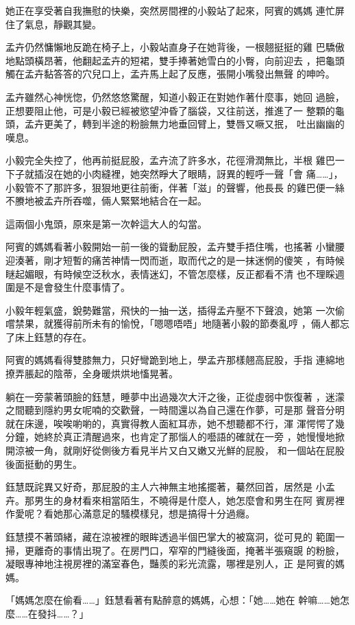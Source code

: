她正在享受著自我撫慰的快樂，突然房間裡的小毅站了起來，阿賓的媽媽
連忙屏住了氣息，靜觀其變。

孟卉仍然慵懶地反跪在椅子上，小毅站直身子在她背後，一根翹挺挺的雞
巴驕傲地點頭橫昂著，他翻起孟卉的短裙，雙手捧著她雪白的小臀，向前迎去
，把龜頭觸在孟卉黏答答的穴兒口上，孟卉馬上起了反應，張開小嘴發出無聲
的呻吟。

孟卉雖然心神恍惚，仍然悠悠驚醒，知道小毅正在對她作著什麼事，她回
過臉，正想要阻止他，可是小毅已經被慾望沖昏了腦袋，又往前送，推進了一
整顆的龜頭，孟卉更美了，轉到半途的粉臉無力地垂回臂上，雙唇又噘又抿，
吐出幽幽的嘆息。

小毅完全失控了，他再前挺屁股，孟卉流了許多水，花徑滑潤無比，半根
雞巴一下子就插沒在她的小肉縫裡，她突然睜大了眼睛，訝異的輕呼一聲「會
痛……」，小毅管不了那許多，狠狠地更往前衝，伴著「滋」的聲響，他長長
的雞巴便一絲不賸地被孟卉所吞噬，倆人緊緊地結合在一起。

這兩個小鬼頭，原來是第一次幹這大人的勾當。

阿賓的媽媽看著小毅開始一前一後的聳動屁股，孟卉雙手捂住嘴，也搖著
小蠻腰迎湊著，剛才短暫的痛苦神情一閃而逝，取而代之的是一抹迷惘的傻笑
，有時候瞇起媚眼，有時候空泛秋水，表情迷幻，不管怎麼樣，反正都看不清
也不理睬週圍是不是會發生什麼事情了。

小毅年輕氣盛，銳勢難當，飛快的一抽一送，插得孟卉壓不下聲浪，她第
一次偷嚐禁果，就獲得前所未有的愉悅，「嗯嗯唔唔」地隨著小毅的節奏亂哼
，倆人都忘了床上鈺慧的存在。

阿賓的媽媽看得雙膝無力，只好彎跪到地上，學孟卉那樣翹高屁股，手指
連綿地撩弄脹起的陰蒂，全身暖烘烘地慉晃著。

躺在一旁蒙著頭臉的鈺慧，睡夢中出過幾次大汗之後，正從虛弱中恢復著
，迷濛之間聽到隱約男女呢喃的交歡聲，一時間還以為自己還在作夢，可是那
聲音分明就在床邊，唉唉喲喲的，真實得教人面紅耳赤，她不想聽都不行，渾
渾愕愕了幾分鐘，她終於真正清醒過來，也肯定了那惱人的囈語的確就在一旁
，她慢慢地掀開涼被一角，就剛好從側後方看見半片又白又嫩又光鮮的屁股，
和一個站在屁股後面挺動的男生。

鈺慧既詫異又好奇，那屁股的主人六神無主地搖擺著，驀然回首，居然是
小孟卉。那男生的身材看來相當陌生，不曉得是什麼人，她怎麼會和男生在阿
賓房裡作愛呢？看她那心滿意足的騷模樣兒，想是搞得十分過癮。

鈺慧摸不著頭緒，藏在涼被裡的眼眸透過半個巴掌大的被窩洞，從可見的
範圍一掃，更離奇的事情出現了。在房門口，窄窄的門縫後面，掩著半張窺覬
的粉臉，凝眼專神地注視房裡的滿室春色，豔羨的彩光流露，哪裡是別人，正
是阿賓的媽媽。

「媽媽怎麼在偷看……」鈺慧看著有點醉意的媽媽，心想：「她……她在
幹嘛……她怎麼……在發抖……？」


